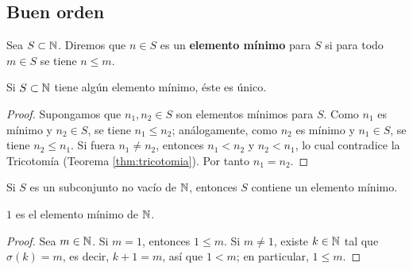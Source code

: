\documentclass[12pt,a4paper]{book}
\begin{document}
    \subsection{Buen orden}

    \begin{definicion}
        Sea $S\subset\mathbb{N}$. Diremos que $n\in S$ es un \textbf{elemento mínimo} para $S$ si para todo $m\in S$ se tiene $n\le m$.
    \end{definicion}

    \begin{proposicion}
        \label{prop:unicidad-minimo}
        Si $S\subset\mathbb{N}$ tiene algún elemento mínimo, éste es único.
    \end{proposicion}
    \begin{proof}
        Supongamos que $n_1,n_2\in S$ son elementos mínimos para $S$. Como $n_1$ es mínimo y $n_2\in S$, se tiene $n_1\le n_2$; análogamente, como $n_2$ es mínimo y $n_1\in S$, se tiene $n_2\le n_1$. Si fuera $n_1\neq n_2$, entonces $n_1<n_2$ y $n_2<n_1$, lo cual contradice la Tricotomía (Teorema \ref{thm:tricotomia}). Por tanto $n_1=n_2$.
    \end{proof}

    \begin{proposicion}
        \label{prop:buen-orden}
        Si $S$ es un subconjunto no vacío de $\mathbb{N}$, entonces $S$ contiene un elemento mínimo.
    \end{proposicion}

    \begin{lema}
        \label{lem:uno-minimo}
        $1$ es el elemento mínimo de $\mathbb{N}$.
    \end{lema}
    \begin{proof}
        Sea $m\in\mathbb{N}$. Si $m=1$, entonces $1\le m$. Si $m\neq1$, existe $k\in\mathbb{N}$ tal que $\sigma(k)=m$, es decir, $k+1=m$, así que $1<m$; en particular, $1\le m$.
    \end{proof}
\end{document}
